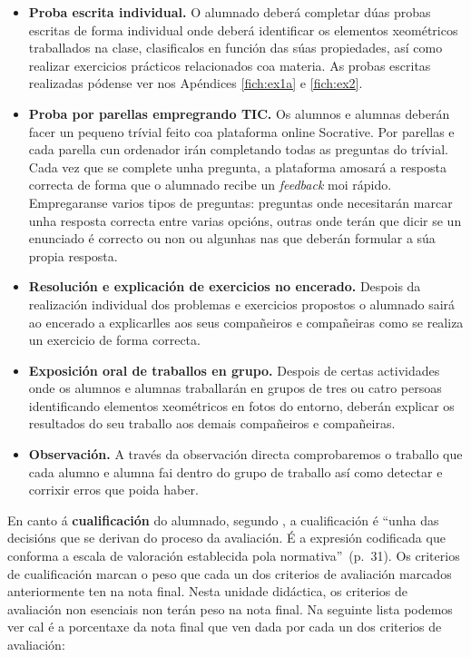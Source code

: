 \begin{itemize}
    \item \textbf{Proba escrita individual.} O alumnado deberá completar dúas probas escritas de forma individual onde deberá identificar os elementos xeométricos traballados na clase, clasificalos en función das súas propiedades, así como realizar exercicios prácticos relacionados coa materia. As probas escritas realizadas pódense ver nos Apéndices \ref{fich:ex1a} e \ref{fich:ex2}.
    \item \textbf{Proba por parellas empregrando TIC.} Os alumnos e alumnas deberán facer un pequeno trívial feito coa plataforma online Socrative. Por parellas e cada parella cun ordenador irán completando todas as preguntas do trívial. Cada vez que se complete unha pregunta, a plataforma amosará a resposta correcta de forma que o alumnado recibe un \emph{feedback} moi rápido. Empregaranse varios tipos de preguntas: preguntas onde necesitarán marcar unha resposta correcta entre varias opcións, outras onde terán que dicir se un enunciado é correcto ou non ou algunhas nas que deberán formular a súa propia resposta.
    \item \textbf{Resolución e explicación de exercicios no encerado.} Despois da realización individual dos problemas e exercicios propostos o alumnado sairá ao encerado a explicarlles aos seus compañeiros e compañeiras como se realiza un exercicio de forma correcta.
    \item \textbf{Exposición oral de traballos en grupo.} Despois de certas actividades onde os alumnos e alumnas traballarán en grupos de tres ou catro persoas identificando elementos xeométricos en fotos do entorno, deberán explicar os resultados do seu traballo aos demais compañeiros e compañeiras.
    \item \textbf{Observación.} A través da observación directa comprobaremos o traballo que cada alumno e alumna fai dentro do grupo de traballo así como detectar e corrixir erros que poida haber.
\end{itemize}

En canto á \textbf{cualificación} do alumnado, segundo , a cualificación é ``unha das decisións que se derivan do proceso da avaliación. É a expresión codificada que conforma a escala de valoración establecida pola normativa''~(p.~31). Os criterios de cualificación marcan o peso que cada un dos criterios de avaliación marcados anteriormente ten na nota final. Nesta unidade didáctica, os criterios de avaliación non esenciais non terán peso na nota final. Na seguinte lista podemos ver cal é a porcentaxe da nota final que ven dada por cada un dos criterios de avaliación:

